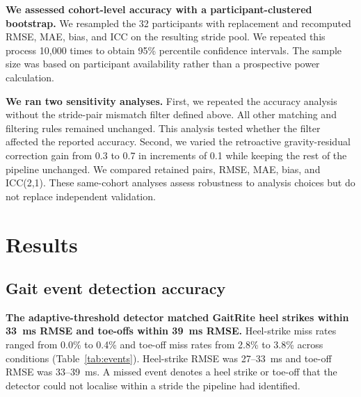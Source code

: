 \documentclass[fleqn,10pt,lineno]{wlpeerj}
\begin{document}
\textbf{We assessed cohort-level accuracy with a participant-clustered bootstrap.} We resampled the 32 participants with replacement and recomputed RMSE, MAE, bias, and ICC on the resulting stride pool. We repeated this process 10{,}000 times to obtain 95\% percentile confidence intervals. The sample size was based on participant availability rather than a prospective power calculation.

\textbf{We ran two sensitivity analyses.} First, we repeated the accuracy analysis without the stride-pair mismatch filter defined above. All other matching and filtering rules remained unchanged. This analysis tested whether the filter affected the reported accuracy. Second, we varied the retroactive gravity-residual correction gain from 0.3 to 0.7 in increments of 0.1 while keeping the rest of the pipeline unchanged. We compared retained pairs, RMSE, MAE, bias, and ICC(2,1). These same-cohort analyses assess robustness to analysis choices but do not replace independent validation.


\clearpage
\section{Results}

\FloatBarrier
\subsection{Gait event detection accuracy}

\textbf{The adaptive-threshold detector matched GaitRite heel strikes within 33~ms RMSE and toe-offs within 39~ms RMSE.}
Heel-strike miss rates ranged from 0.0\% to 0.4\% and toe-off miss rates from 2.8\% to 3.8\% across conditions (Table~\ref{tab:events}). Heel-strike RMSE was 27--33~ms and toe-off RMSE was 33--39~ms. A missed event denotes a heel strike or toe-off that the detector could not localise within a stride the pipeline had identified.
\end{document}
